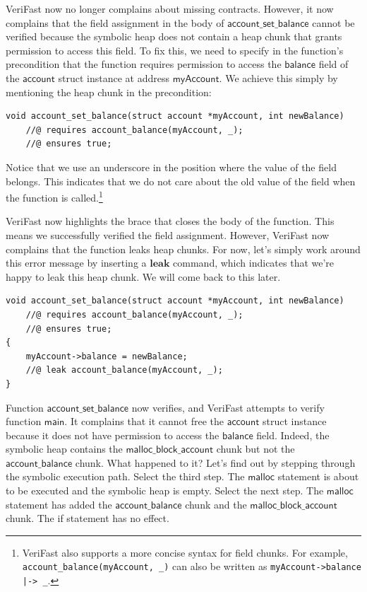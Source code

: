 \documentclass{article}
\begin{document}
VeriFast now no longer complains about missing contracts.
However, it now complains that the field assignment in the body
of $\mathsf{account\_set\_balance}$ cannot be verified because
the symbolic heap does not contain a heap chunk that grants
permission to access this field. To fix this, we need to
specify in the function's precondition that the function
requires permission to access the $\mathsf{balance}$ field of
the $\mathsf{account}$ struct instance at address
$\mathsf{myAccount}$. We achieve this simply by mentioning the
heap chunk in the precondition:
\begin{lstlisting}
void account_set_balance(struct account *myAccount, int newBalance)
    //@ requires account_balance(myAccount, _);
    //@ ensures true;
\end{lstlisting}
Notice that we use an underscore in the position where the
value of the field belongs. This indicates that we do not care
about the old value of the field when the function is
called.\footnote{VeriFast also supports a more concise syntax
for field chunks. For example,
\lstinline!account_balance(myAccount, _)! can also be written as
\lstinline!myAccount->balance |-> _!.}

VeriFast now highlights the brace that closes the body of the
function. This means we successfully verified the field
assignment. However, VeriFast now complains that the function
leaks heap chunks. For now, let's simply work around this error
message by inserting a $\mathbf{leak}$ command, which indicates
that we're happy to leak this heap chunk. We will come back to
this later.
\begin{lstlisting}
void account_set_balance(struct account *myAccount, int newBalance)
    //@ requires account_balance(myAccount, _);
    //@ ensures true;
{
    myAccount->balance = newBalance;
    //@ leak account_balance(myAccount, _);
}
\end{lstlisting}

Function $\mathsf{account\_set\_balance}$ now verifies, and
VeriFast attempts to verify function $\mathsf{main}$. It
complains that it cannot free the $\mathsf{account}$ struct
instance because it does not have permission to access the
$\mathsf{balance}$ field. Indeed, the symbolic heap contains
the $\mathsf{malloc\_block\_account}$ chunk but not the
$\mathsf{account\_balance}$ chunk. What happened to it? Let's
find out by stepping through the symbolic execution path.
Select the third step. The $\mathsf{malloc}$ statement is about
to be executed and the symbolic heap is empty. Select the next
step. The $\mathsf{malloc}$ statement has added the
$\mathsf{account\_balance}$ chunk and the
$\mathsf{malloc\_block\_account}$ chunk. The if statement has
no effect.
\end{document}
